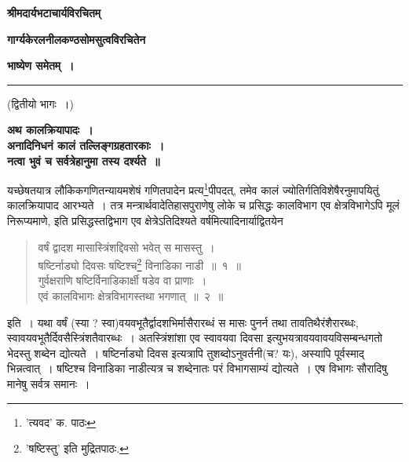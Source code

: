 \documentclass[11pt, openany]{book}
\begin{document}
\newpage


	

\begin{center}
\textbf{\vspace{2cm}{॥~श्रीः~॥}}

\textbf{\large श्रीमदार्यभटाचार्यविरचितम्}


\vspace{0.2cm}\textbf{\large गार्ग्यकेरलनीलकण्ठसोमसुत्वविरचितेन}

\vspace{0.2cm}\textbf{\large भाष्येण समेतम्~।}

\rule{3cm}{.3mm} 

\vspace{0.2cm}
(द्वितीयो भागः~।)

\vspace{0.2cm}
\textbf{अथ कालक्रियापादः~।}\\
\vspace{0.4cm}
\textbf{अनादिनिधनं कालं तल्लिङ्गग्रहतारकाः~।\\
नत्वा भुवं च सर्वत्रेहानुमा तस्य दर्श्यते~॥}
\end{center}

यच्छेषतयात्र लौकिकगणितन्यायमशेषं गणितपादेन प्रत्य\renewcommand{\thefootnote}{१}\footnote{'त्यवद' क. पाठः}पीपदत्, तमेव कालं ज्योतिर्गतिविशेषैरनुमापयितुं कालक्रियापाद आरभ्यते~। तत्र मन्त्रार्थवादेतिहासपुराणेषु लोके च प्रसिद्धः कालविभाग एव क्षेत्रविभागेऽपि मूलं निरूप्यमाणे, इति प्रसिद्धस्तद्विभाग एव क्षेत्रेऽतिदिश्यते वर्षमित्यादिनार्याद्वितयेन\textendash

\begin{quote} 
{\ab वर्षं द्वादश मासास्त्रिंशद्दिवसो भवेत् स मासस्तु~।\\
षष्टिर्नाड्यो दिवसः षष्टिश्च}\renewcommand{\thefootnote}{*}\footnote{'षष्टिस्तु' इति मुद्रितपाठः.} 
{\ab विनाडिका नाडी~॥~१~॥\\
गुर्वक्षराणि षष्टिर्विनाडिकार्क्षी षडेव वा प्राणाः~।\\
एवं कालविभागः क्षेत्रविभागस्तथा भगणात्~॥~२~॥}
\end{quote}

इति~। यथा वर्षं (स्या ? स्वा)वयवभूतैर्द्वादशभिर्मासैरारब्धं स मासः पुनर्न तथा तावतिथैरंशैरारब्धः, स्वावयवभूतैर्दिवसैस्त्रिंशतैवारब्धः~।
अतस्त्रिंशांशा एव स्वावयवा दिवसा इत्युभयत्रावयवावयविसम्बन्धगतो भेदस्तु शब्देन द्योत्यते~। षष्टिर्नाड्यो दिवस इत्यत्रापि तुशब्दोऽनुवर्तनी(च?
यः), अस्यापि पूर्वस्माद् भिन्नत्वात्~। षष्टिश्च विनाडिका नाडीत्यत्र च शब्देनातः परं विभागसाम्यं द्योत्यते~। एष विभागः सौरादिषु मानेषु सर्वत्र समानः~।
\end{document}
